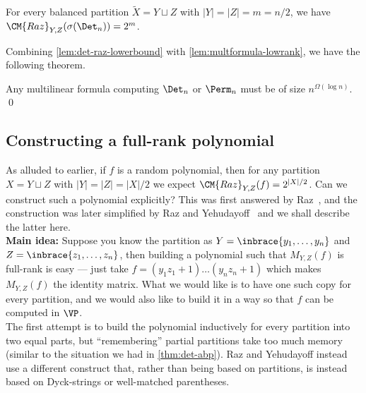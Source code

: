 \begin{lemma}\label{lem:det-raz-lowerbound}
  For every balanced partition $\tilde{X} = Y \sqcup Z$ with $|Y| = |Z| = m = n/2$, we have $\CM{Raz}_{Y,Z}(\sigma(\Det_n)) = 2^m$. 
\end{lemma}


Combining \autoref{lem:det-raz-lowerbound} with \autoref{lem:multformula-lowrank}, we have the following theorem. 

\begin{theorem} Any multilinear formula computing $\Det_n$ or $\Perm_n$ must be of size $n^{\Omega(\log n)}$. \qed
\end{theorem}

\subsection{Constructing a full-rank polynomial}\label{sec:fullrankpoly}

As alluded to earlier,  if $f$ is a random polynomial, then for any partition $X = Y \sqcup Z$ with $|Y| = |Z| = |X|/2$ we expect $\CM{Raz}_{Y,Z}(f) = 2^{|X|/2}$. 
Can we construct such a polynomial explicitly? 
This was first answered by Raz~\cite{Raz06}, and the construction was later simplified by Raz and Yehudayoff~\cite{ry08} and we shall describe the latter here. \\

{\bf Main idea:} Suppose you know the partition as $Y = \inbrace{y_1,\dots, y_n}$ and $Z = \inbrace{z_1,\dots, z_n}$, then building a polynomial such that $M_{Y,Z}(f)$ is full-rank is easy --- just take $f = (y_1z_1 + 1)\dots (y_n z_n + 1)$ which makes $M_{Y,Z}(f)$ the identity matrix. 
What we would like is to have one such copy for every partition, and we would also like to build it in a way so that $f$ can be computed in $\VP$. \\

The first attempt is to build the polynomial inductively for every partition into two equal parts, but ``remembering'' partial partitions take too much memory (similar to the situation we had in \autoref{thm:det-abp}). 
Raz and Yehudayoff instead use a different construct that, rather than being based on partitions, is instead based on Dyck-strings or well-matched parentheses. 

